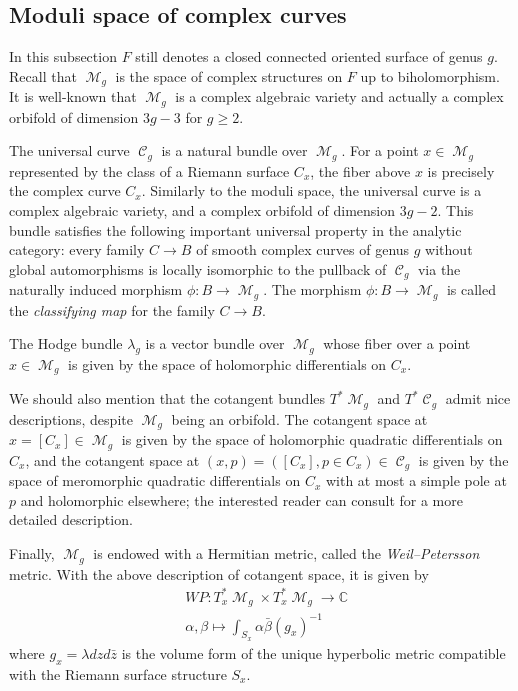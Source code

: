 \documentclass{article}
\DeclareMathOperator{\m}{\mathcal{M}}
\DeclareMathOperator{\uc}{\mathcal{C}}
\theoremstyle{plain}
\theoremstyle{remark}
\theoremstyle{definition}
\begin{document}
\subsection{Moduli space of complex curves}
In this subsection $F$ still denotes a closed connected oriented surface of genus $g$. Recall that $\m_g$ is the space of complex structures on $F$ up to biholomorphism. It is well-known that $\m_g$ is a complex algebraic variety and actually a complex orbifold of dimension $3g-3$ for $g\geq 2$.\par 
The universal curve $\uc_g$ is a natural bundle over $\m_g$. For a point $x\in\m_g$ represented by the class of a Riemann surface $C_x$, the fiber above $x$ is precisely the complex curve $C_x$. Similarly to the moduli space, the universal curve is a complex algebraic variety, and a complex orbifold of dimension $3g-2$. This bundle satisfies the following important universal property in the analytic category\thinspace: every family $C\to B$ of smooth complex curves of genus $g$ without global automorphisms is locally isomorphic to the pullback of $\uc_g$ via the naturally induced morphism $\phi :B \to \m_g$. The morphism $\phi: B\to \m_g$ is called the \emph{classifying map} for the family $C\to B$.\par 
The Hodge bundle $\lambda_g$ is a vector bundle over $\m_g$ whose fiber over a point $x\in \m_g$ is given by the space of holomorphic differentials on $C_x$. \par 
We should also mention that the cotangent bundles $T^*\m_g$ and $T^*\uc_g$ admit nice descriptions, despite $\m_g$ being an orbifold. The cotangent space at $x=[C_x]\in\m_g$ is given by the space of holomorphic quadratic differentials on $C_x$, and the cotangent space at $(x,p) = ([C_x], p\in C_x) \in \uc_g$ is given by the space of meromorphic quadratic differentials on $C_x$ with at most a simple pole at $p$ and holomorphic elsewhere; the interested reader can consult \cite{ArbarelloCornalbaGriffiths} for a more detailed description. \par 
Finally, $\m_g$ is endowed with a Hermitian metric, called the \emph{Weil--Petersson} metric. With the above description of cotangent space, it is given by 
    \begin{align*}
        &WP: T^*_x \m_g \times T^*_x \m_g \to \mathbb{C} \\
        &\alpha, \beta \mapsto \int_{S_x} \alpha \bar{\beta} (g_x)^{-1}
    \end{align*}
    where $g_x = \lambda dz d\bar{z}$ is the volume form of the unique hyperbolic metric compatible with the Riemann surface structure $S_x$.
\end{document}
